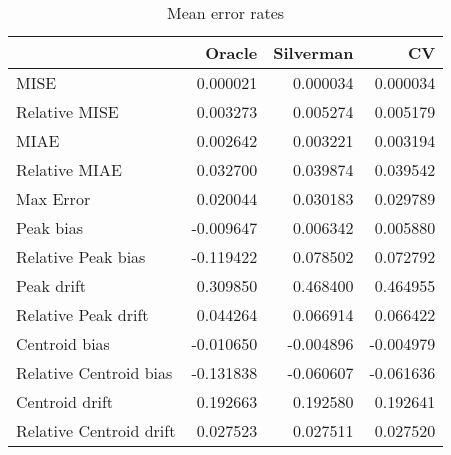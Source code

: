 \begin{table}[ht]
\centering
\begin{tabular}{lrrr}
  \hline
 & Oracle & Silverman & CV \\ 
  \hline
MISE & 0.000021 & 0.000034 & 0.000034 \\ 
  Relative MISE & 0.003273 & 0.005274 & 0.005179 \\ 
  MIAE & 0.002642 & 0.003221 & 0.003194 \\ 
  Relative MIAE & 0.032700 & 0.039874 & 0.039542 \\ 
  Max Error & 0.020044 & 0.030183 & 0.029789 \\ 
  Peak bias & -0.009647 & 0.006342 & 0.005880 \\ 
  Relative Peak bias & -0.119422 & 0.078502 & 0.072792 \\ 
  Peak drift & 0.309850 & 0.468400 & 0.464955 \\ 
  Relative Peak drift & 0.044264 & 0.066914 & 0.066422 \\ 
  Centroid bias & -0.010650 & -0.004896 & -0.004979 \\ 
  Relative Centroid bias & -0.131838 & -0.060607 & -0.061636 \\ 
  Centroid drift & 0.192663 & 0.192580 & 0.192641 \\ 
  Relative Centroid drift & 0.027523 & 0.027511 & 0.027520 \\ 
   \hline
\end{tabular}
\caption{Mean error rates} 
\label{tbl:mean_error_rates}
\end{table}
